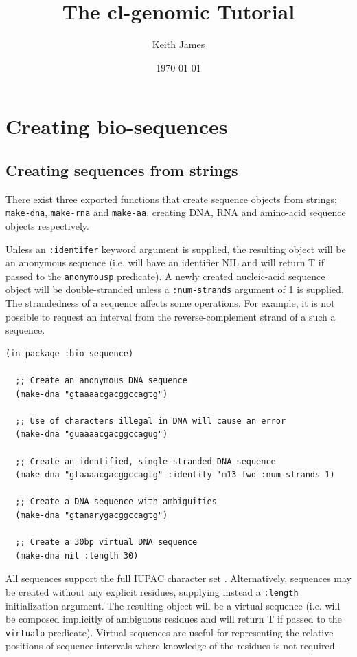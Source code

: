 \documentclass[a4paper, 12pt]{article}
\begin{document}
\title{The cl-genomic Tutorial}
\author{Keith James}
\date{\today}

\maketitle


\section{Creating bio-sequences}
\label{sec:creating-bioseq}

\subsection{Creating sequences from strings}
\label{sec:create-bioseq-str}

There exist three exported functions that create sequence objects from
strings; \lstinline!make-dna!, \lstinline!make-rna! and
\lstinline!make-aa!, creating DNA, RNA and amino-acid sequence objects
respectively.

Unless an \lstinline!:identifer! keyword argument is supplied, the
resulting object will be an anonymous sequence (i.e. will have an
identifier NIL and will return T if passed to the
\lstinline!anonymousp! predicate). A newly created nucleic-acid
sequence object will be double-stranded unless a
\lstinline!:num-strands! argument of 1 is supplied. The strandedness
of a sequence affects some operations. For example, it is not possible
to request an interval from the reverse-complement strand of a such a
sequence.

\begin{lstlisting}[caption={Making DNA sequences from strings},
  label=lst:make-dnaseq-string]
  (in-package :bio-sequence)
  
  ;; Create an anonymous DNA sequence
  (make-dna "gtaaaacgacggccagtg")
  
  ;; Use of characters illegal in DNA will cause an error
  (make-dna "guaaaacgacggccagug")

  ;; Create an identified, single-stranded DNA sequence 
  (make-dna "gtaaaacgacggccagtg" :identity 'm13-fwd :num-strands 1)

  ;; Create a DNA sequence with ambiguities
  (make-dna "gtanarygacggccagtg")

  ;; Create a 30bp virtual DNA sequence
  (make-dna nil :length 30)
\end{lstlisting}

All sequences support the full IUPAC character set
\cite{PMID:2582368}. Alternatively, sequences may be created without
any explicit residues, supplying instead a \lstinline!:length!
initialization argument. The resulting object will be a virtual
sequence (i.e. will be composed implicitly of ambiguous residues and
will return T if passed to the \lstinline!virtualp!
predicate). Virtual sequences are useful for representing the relative
positions of sequence intervals where knowledge of the residues is not
required.
\end{document}
